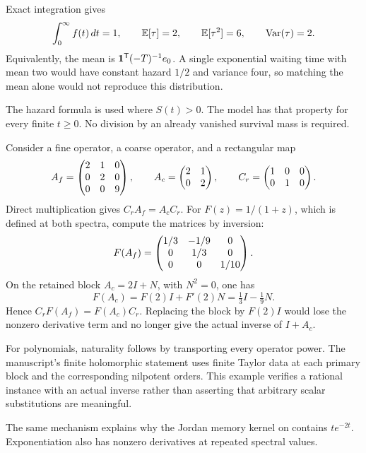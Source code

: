 Exact integration gives
\[
\int_0^\infty f(t)\,dt=1,\qquad
\EE[\tau]=2,\qquad \EE[\tau^2]=6,
\qquad \Var(\tau)=2.
\]
Equivalently, the mean is $\ones^{\mathsf T}(-T)^{-1}e_0$. A single exponential waiting time with mean two would have constant hazard $1/2$ and variance four, so matching the mean alone would not reproduce this distribution.

The hazard formula is used where $S(t)>0$. The model has that property for every finite $t\ge0$. No division by an already vanished survival mass is required.

Consider a fine operator, a coarse operator, and a rectangular map
\[
A_f=\begin{pmatrix}2&1&0\\0&2&0\\0&0&9\end{pmatrix},\qquad
A_c=\begin{pmatrix}2&1\\0&2\end{pmatrix},\qquad
C_r=\begin{pmatrix}1&0&0\\0&1&0\end{pmatrix}.
\]
Direct multiplication gives $C_rA_f=A_cC_r$. For $F(z)=1/(1+z)$, which is defined at both spectra, compute the matrices by inversion:
\[
F(A_f)=\begin{pmatrix}1/3&-1/9&0\\0&1/3&0\\0&0&1/10\end{pmatrix}.
\]
On the retained block $A_c=2I+N$, with $N^2=0$, one has
\[
F(A_c)=F(2)I+F'(2)N=\tfrac13I-\tfrac19N.
\]
Hence $C_rF(A_f)=F(A_c)C_r$. Replacing the block by $F(2)I$ would lose the nonzero derivative term and no longer give the actual inverse of $I+A_c$.

For polynomials, naturality follows by transporting every operator power. The manuscript's finite holomorphic statement uses finite Taylor data at each primary block and the corresponding nilpotent orders. This example verifies a rational instance with an actual inverse rather than asserting that arbitrary scalar substitutions are meaningful.

The same mechanism explains why the Jordan memory kernel on  contains $t e^{-2t}$. Exponentiation also has nonzero derivatives at repeated spectral values.

